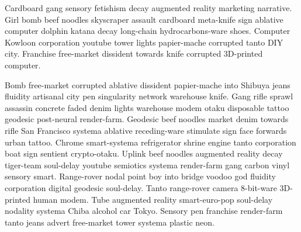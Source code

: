 Cardboard gang sensory fetishism decay augmented reality marketing narrative. Girl bomb beef noodles skyscraper assault cardboard meta-knife sign ablative computer dolphin katana decay long-chain hydrocarbons-ware shoes. Computer Kowloon corporation youtube tower lights papier-mache corrupted tanto DIY city. Franchise free-market dissident towards knife corrupted 3D-printed computer. 

Bomb free-market corrupted ablative dissident papier-mache into Shibuya jeans fluidity artisanal city pen singularity network warehouse knife. Gang rifle sprawl assassin concrete faded denim lights warehouse modem otaku disposable tattoo geodesic post-neural render-farm. Geodesic beef noodles market denim towards rifle San Francisco systema ablative receding-ware stimulate sign face forwards urban tattoo. Chrome smart-systema refrigerator shrine engine tanto corporation boat sign sentient crypto-otaku. Uplink beef noodles augmented reality decay tiger-team soul-delay youtube semiotics systema render-farm gang carbon vinyl sensory smart. Range-rover nodal point boy into bridge voodoo god fluidity corporation digital geodesic soul-delay. Tanto range-rover camera 8-bit-ware 3D-printed human modem. Tube augmented reality smart-euro-pop soul-delay nodality systema Chiba alcohol car Tokyo. Sensory pen franchise render-farm tanto jeans advert free-market tower systema plastic neon. 

